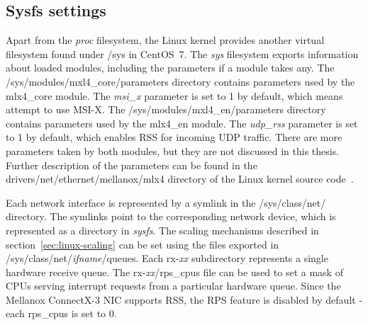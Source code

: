 
\subsection{Sysfs settings}\label{subsec:analysis-settings-sysfs}
Apart from the {\it{proc}} filesystem, the Linux kernel provides another virtual filesystem found under /sys in CentOS~7.
The {\it{sys}} filesystem exports information about loaded modules, including the parameters if a module takes any.
The /sys/modules/mxl4\_core/parameters directory contains parameters used by the mlx4\_core module.
The {\it{msi\_x}} parameter is set to 1 by default, which means attempt to use MSI-X.
The /sys/modules/mxl4\_en/parameters directory contains parameters used by the mlx4\_en module.
The {\it{udp\_rss}} parameter is set to 1 by default, which enables RSS for incoming UDP traffic.
There are more parameters taken by both modules, but they are not discussed in this thesis.
Further description of the parameters can be found
in the drivers/net/ethernet/mellanox/mlx4 directory of the Linux kernel source code~\cite{kernel-source}.

Each network interface is represented by a symlink in the /sys/class/net/ directory.
The symlinks point to the corresponding network device, which is represented as a directory in {\it{sysfs}}.
The scaling mechanisms described in section~\ref{sec:linux-scaling} can be set
using the files exported in /sys/class/net/{\it{ifname}}/queues.
Each rx-{\it{xx}} subdirectory represents a single hardware receive queue.
The rx-{\it{xx}}/rps\_cpus file can be used to set a mask of CPUs serving interrupt requests from a particular hardware queue.
Since the Mellanox ConnectX-3 NIC supports RSS, the RPS feature is disabled by default - each rps\_cpus is set to 0.

